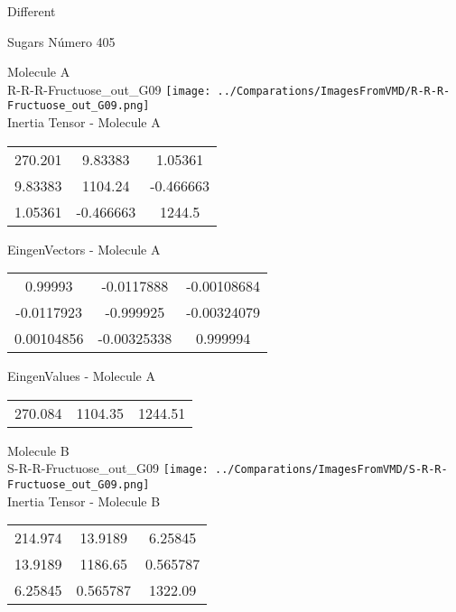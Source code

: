 \begin{center}
\vtab
\vtab
\textcolor{NavyBlue}{\Large Different}
\end{center}

 \newpage

\vtab[-2cm]
\begin{center}
{\large Sugars \tab Número 405}
\end{center}
\begin{multicols}{2}
\begin{center}

Molecule A \\ 
R-R-R-Fructuose\_out\_G09
\texttt{[image: ../Comparations/ImagesFromVMD/R-R-R-Fructuose\_out\_G09.png]}
\\
Inertia Tensor - Molecule A \\
\vtab

\begin{tabular}{|c c c|}
270.201	 & 	9.83383	 & 	1.05361	 \\
9.83383	 & 	1104.24	 & 	-0.466663	 \\
1.05361	 & 	-0.466663	 & 	1244.5
\end{tabular}

\vtab
 EingenVectors - Molecule A     \\
\vtab
\begin{tabular}{|c c c|}
0.99993	 & 	-0.0117888	 & 	-0.00108684	 \\
-0.0117923	 & 	-0.999925	 & 	-0.00324079	 \\
0.00104856	 & 	-0.00325338	 & 	0.999994
\end{tabular}

\vtab
 EingenValues - Molecule A     \\
\vtab
\begin{tabular}{|c c c|}
270.084	 & 	1104.35	 & 	1244.51	 \\
\end{tabular}
\columnbreak

Molecule B \\ 
S-R-R-Fructuose\_out\_G09
\texttt{[image: ../Comparations/ImagesFromVMD/S-R-R-Fructuose\_out\_G09.png]}
\\
Inertia Tensor - Molecule B \\
\vtab

\begin{tabular}{|c c c|}
214.974	 & 	13.9189	 & 	6.25845	 \\
13.9189	 & 	1186.65	 & 	0.565787	 \\
6.25845	 & 	0.565787	 & 	1322.09
\end{tabular}


\end{center}
\end{multicols}
